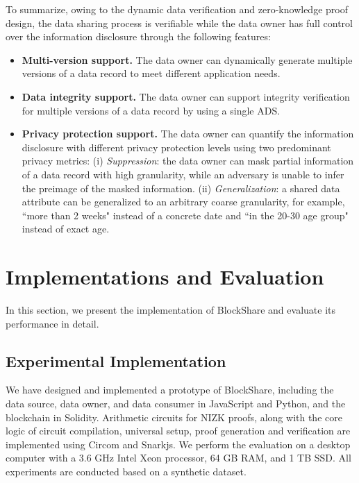 \documentclass[11pt,divpdfm]{article}
\begin{document}
To summarize, owing to the dynamic data verification and zero-knowledge proof design, the data sharing process is verifiable while the data owner has full control over the information disclosure through the following features:
\begin{itemize}
	\item \textbf{Multi-version support.}
	The data owner can dynamically generate multiple versions of a data record to meet different application needs.
	\item \textbf{Data integrity support.}
	The data owner can support integrity verification for multiple versions of a data record by using a single ADS.
	\item \textbf{Privacy protection support.}
	The data owner can quantify the information disclosure with different privacy protection levels using two predominant privacy metrics:
	(i) \emph{Suppression}: the data owner can mask partial information of a data record with high granularity, while an adversary is unable to infer the preimage of the masked information.
	(ii) \emph{Generalization}: a shared data attribute can be generalized to an arbitrary coarse granularity, for example, ``more than 2 weeks" instead of a concrete date and ``in the 20-30 age group" instead of exact age.
\end{itemize}




\section{Implementations and Evaluation}
In this section, we present the implementation of BlockShare and evaluate its performance in detail.

\subsection{Experimental Implementation}
We have designed and implemented a prototype of BlockShare, including the data source, data owner, and data consumer in JavaScript and Python, and the blockchain in Solidity.
Arithmetic circuits for NIZK proofs, along with the core logic of circuit compilation, universal setup, proof generation and verification are implemented using Circom and Snarkjs.
We perform the evaluation on a desktop computer with a 3.6 GHz Intel Xeon processor, 64 GB RAM, and 1 TB SSD.
All experiments are conducted based on a synthetic dataset.
\end{document}
